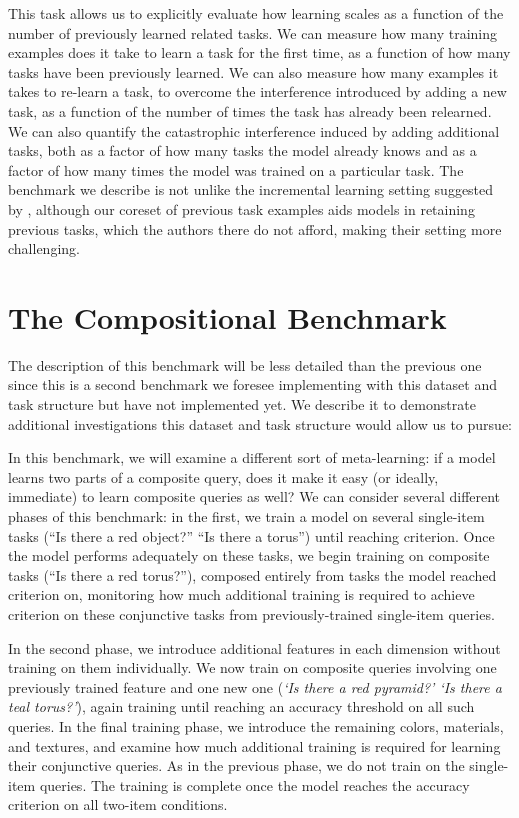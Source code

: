 This task allows us to explicitly evaluate how learning scales as a function of the number of previously learned related tasks. We can measure how many training examples does it take to learn a task for the first time, as a function of how many tasks have been previously learned. We can also measure how many examples it takes to re-learn a task, to overcome the interference introduced by adding a new task, as a function of the number of times the task has already been relearned. We can also quantify the catastrophic interference induced by adding additional tasks, both as a factor of how many tasks the model already knows and as a factor of how many times the model was trained on a particular task. The benchmark we describe is not unlike the incremental learning setting suggested by \textcite{Kemker2017a}, although our coreset of previous task examples aids models in retaining previous tasks, which the authors there do not afford, making their setting more challenging.

\section{The Compositional Benchmark}
The description of this benchmark will be less detailed than the previous one since this is a second benchmark we foresee implementing with this dataset and task structure but have not implemented yet. We describe it to demonstrate additional investigations this dataset and task structure would allow us to pursue: 

In this benchmark, we will examine a different sort of meta-learning: if a model learns two parts of a composite query, does it make it easy (or ideally, immediate) to learn composite queries as well? We can consider several different phases of this benchmark: in the first, we train a model on several single-item tasks (“Is there a red object?” “Is there a torus”) until reaching criterion. Once the model performs adequately on these tasks, we begin training on composite tasks (“Is there a red torus?”), composed entirely from tasks the model reached criterion on, monitoring how much additional training is required to achieve criterion on these conjunctive tasks from previously-trained single-item queries. 

In the second phase, we introduce additional features in each dimension without training on them individually. We now train on composite queries involving one previously trained feature and one new one (\textit{`Is there a red pyramid?’ `Is there a teal torus?’}), again training until reaching an accuracy threshold on all such queries. In the final training phase, we introduce the remaining colors, materials, and textures, and examine how much additional training is required for learning their conjunctive queries. As in the previous phase, we do not train on the single-item queries. The training is complete once the model reaches the accuracy criterion on all two-item conditions. 

